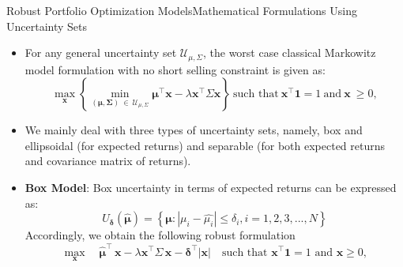 \documentclass{beamer}
\begin{document}
\begin{frame}{Robust Portfolio Optimization Models}{Mathematical Formulations Using Uncertainty Sets}
\begin{itemize}
    \item {For any general uncertainty set $\displaystyle{\mathcal{U}_{\mu,\Sigma}}$, the worst case classical Markowitz model formulation with no short selling constraint is given as:
\begin{equation}
\label{eq:worst_case_classical_markowitz}
\max\limits_{\mathbf{x}}\left\{\min\limits_{\left(\boldsymbol{\mu},\boldsymbol{\Sigma}\right)~\in~\mathcal{U}_{\mu,\Sigma}}\boldsymbol{\mu}^{\top}\mathbf{x}
-\lambda\mathbf{x^{\top}}\Sigma\mathbf{x}\right\}~\text{such that}~\mathbf{x^{\top}}\mathbf{1}=1~\text{and}~\mathbf{x}~\geq 0,
\end{equation}}
   \item{ We mainly deal with three types of uncertainty sets, namely, box and ellipsoidal (for expected returns) and separable (for both expected returns and covariance matrix of returns).}
   \item{\textbf{Box Model}:
   Box uncertainty in terms of expected returns can be expressed as:
\begin{equation}
U_{\boldsymbol{\delta}}(\boldsymbol{\hat{\mu}}) = \left\{ \boldsymbol{\mu}: | \mu_i - \hat{\mu_i}| \leq \delta_i, i = 1,2,3,...,N \right\}    
\end{equation}
Accordingly, we obtain the following robust formulation 
\begin{equation}
\label{eqn:trans_eqn_box}
\max_\mathbf{x} \quad \boldsymbol{\hat{\mu}}^{\top} \, \mathbf{x}-  \lambda \mathbf{x^{\top}}\Sigma \, \mathbf{x} - \boldsymbol{\delta}^{\top}|\mathbf{x}| \quad \text{such that } \mathbf{x^{\top}}\mathbf{1}  = 1 \text{ and } \mathbf{x} \geq 0,  
\end{equation}}
\end{itemize}
\end{frame}
\end{document}
